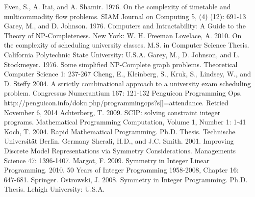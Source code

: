 \documentclass{svjour3}                     %
\begin{document}
\begin{thebibliography}{9}
	Even, S., A. Itai, and A. Shamir. 1976. On the complexity of timetable and multicommodity flow problems. SIAM Journal on Computing 5, (4) (12): 691-13
	Garey, M., and D. Johnson. 1976. Computers and Intractability: A Guide to the Theory of NP-Completeness. New York: W. H. Freeman
	Lovelace, A. 2010. On the complexity of scheduling university classes. M.S. in Computer Science Thesis. California Polytechnic State University: U.S.A.	
	Garey, M., D. Johnson, and L. Stockmeyer. 1976. Some simplified NP-Complete graph problems. Theoretical Computer Science 1: 237-267
	Cheng, E., Kleinberg, S., Kruk, S., Lindsey, W., and D. Steffy 2004. A strictly combinational approach to a university exam scheduling problem. Congressus Numerantium 167: 121-132
	Penguicon Programming Ops. http://penguicon.info/doku.php/programmingops?s[]=attendance. Retried November 6, 2014
	Achterberg, T. 2009. SCIP: solving constraint integer programs. Mathematical Programming Computation, Volume 1, Number 1: 1-41
	Koch, T. 2004. Rapid Mathematical Programming. Ph.D. Thesis. Technische Universit{\"a}t Berlin. Germany
	Sherali, H.D., and J.C. Smith. 2001. Improving Discrete Model Representations via Symmetry Considerations. Managements Science 47: 1396-1407.
	Margot, F. 2009. Symmetry in Integer Linear Programming. 2010. 50 Years of Integer Programming 1958-2008, Chapter 16: 647-681. Springer.
	Ostrowski, J. 2008. Symmetry in Integer Programming. Ph.D. Thesis. Lehigh University: U.S.A. 
\end{thebibliography}
	
\end{document}
